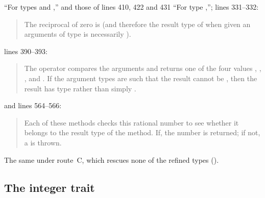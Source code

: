 \begin{description}
``For types  and ,'' and those of lines
410, 422 and 431 ``For type ,''; lines 331--332:
\begin{quote}
The reciprocal of zero is \EXP{+\infty} (and therefore the result type of \EXP{/}
when given an arguments of type  is necessarily ).
\end{quote}
lines 390--393:
\begin{quote}
The  operator compares the arguments and returns one of the four values
, , , and .
If the argument types are such that the result cannot be ,
then the result has type  rather than simply .
\end{quote}
and lines 564--566:
\begin{quote}
Each of these methods checks this rational number to see whether it belongs
to the result type of the method.  If, the number is returned; if not,
a  is thrown.
\end{quote}
\item[Route C] The same under route~C, which rescues none of the refined types
().
\end{description}

\subsection{The integer trait}

